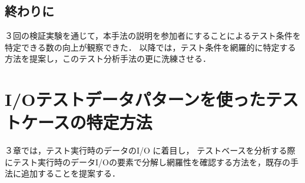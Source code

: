 \documentclass[a4paper,12pt]{jreport}
\begin{document}
%

\section{終わりに}
３回の検証実験を通じて，本手法の説明を参加者にすることによるテスト条件を特定できる数の向上が観察できた．
以降では，テスト条件を網羅的に特定する方法を提案し，このテスト分析手法の更に洗練させる．

\chapter{I/Oテストデータパターンを使ったテストケースの特定方法}
３章では，テスト実行時のデータのI/O に着目し，
テストベースを分析する際にテスト実行時のデータI/Oの要素で分解し網羅性を確認する方法を，既存の手法に追加することを提案する．
\end{document}
